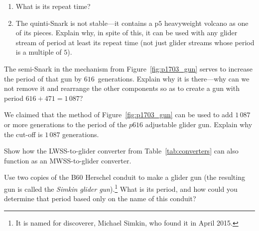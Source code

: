 \begin{multicols}{2}
\begin{problem}
\begin{enumerate}[label=\bf\color{ocre}(\alph*)]
			\item What is its repeat time?
			
			\item The quinti-Snark is not stable---it contains a p$5$ heavyweight volcano as one of its pieces. Explain why, in spite of this, it can be used with any glider stream of period at least its repeat time (not just glider streams whose period is a multiple of $5$).
		\end{enumerate}
	\end{problem}
	
	
	\mfilbreak
	
	
	\begin{problem}\label{exer:p1703_gun_why_semisnark}
		The semi-Snark in the mechanism from Figure~\ref{fig:p1703_gun} serves to increase the period of that gun by $616$~generations. Explain why it is there---why can we not remove it and rearrange the other components so as to create a gun with period $616+471 = 1\, 087$?
	\end{problem}
	
	
	\mfilbreak
	
	
	\begin{problem}\label{exer:p1703_gun}
		We claimed that the method of Figure~\ref{fig:p1703_gun} can be used to add $1\, 087$ or more generations to the period of the $p616$ adjustable glider gun. Explain why the cut-off is $1\, 087$ generations.
		
	\end{problem}
	
	
	\mfilbreak
	
	
	\begin{problem}\label{exer:mwss_to_g}
		Show how the LWSS-to-glider converter from Table~\ref{tab:converters} can also function as an MWSS-to-glider converter.
	\end{problem}
	
	
	\mfilbreak
	
	
	\begin{problemstar}\label{exer:simkin_glider_gun}
		Use two copies of the B60 Herschel conduit to make a glider gun (the resulting gun is called the \emph{Simkin glider gun}).\footnote{It is named for discoverer, Michael Simkin, who found it in April 2015.} What is its period, and how could you determine that period based only on the name of this conduit?
	\end{problemstar}
	

\end{multicols}
